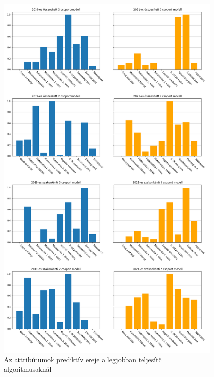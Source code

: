 \documentclass[12pt]{article}
\begin{document}
\begin{figure}[H]
\centering
\includegraphics[scale=0.57]{kepek/modell_valtozo.png}
\caption{Az attribútumok prediktív ereje a legjobban teljesítő algoritmusoknál}
\label{fig:variables}
\end{figure}



%	
\end{document}
